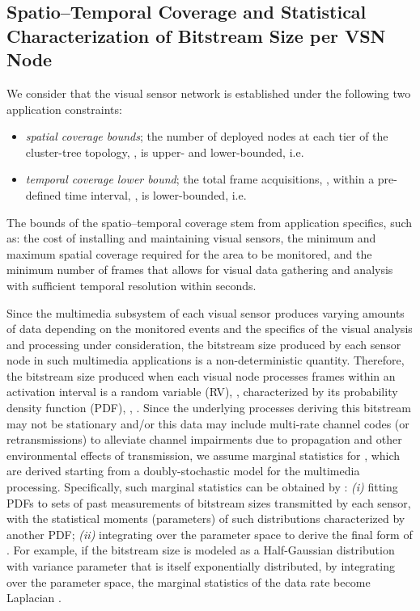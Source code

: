 \documentclass[twocolumn,english]{IEEEtran}
\theoremstyle{plain}
\theoremstyle{definition}
\begin{document}
\subsection{Spatio--Temporal Coverage and Statistical Characterization of Bitstream
Size per VSN Node}

We consider that the visual sensor network is established under the
following two application constraints:

\begin{itemize}[leftmargin=*] 
\item

\emph{spatial coverage bounds}; the number of deployed nodes at each
tier of the cluster-tree topology, , is upper- and lower-bounded,
i.e. 

\item

\emph{temporal coverage lower bound}; the total frame acquisitions,
, within a pre-defined time interval, , is lower-bounded,
i.e. 

\end{itemize}

The bounds of the spatio--temporal coverage stem from application
specifics, such as: the cost of installing and maintaining visual
sensors, the minimum and maximum spatial coverage required for the
area to be monitored, and the minimum number of frames that allows
for visual data gathering and analysis with sufficient temporal resolution
within  seconds.

Since the multimedia subsystem of each visual sensor produces varying
amounts of data depending on the monitored events and the specifics
of the visual analysis and processing under consideration, the bitstream
size produced by each sensor node in such multimedia applications
is a non-deterministic quantity. Therefore, the bitstream size produced
when each visual node processes  frames within an activation interval
is a random variable (RV), , characterized by its
probability density function (PDF), , .
Since the underlying processes deriving this bitstream may not be
stationary and/or this data may include multi-rate channel codes (or
retransmissions) to alleviate channel impairments due to propagation
and other environmental effects of transmission, we assume marginal
statistics for , which are derived starting
from a doubly-stochastic model for the multimedia processing. Specifically,
such marginal statistics can be obtained by \cite{LamGoodmanDCT,foo2008analytical}:
\emph{(i)} fitting PDFs to sets of past measurements of bitstream
sizes transmitted by each sensor, with the statistical moments (parameters)
of such distributions characterized by another PDF; \emph{(ii)} integrating
over the parameter space to derive the final form of .
For example, if the bitstream size is modeled as a Half-Gaussian distribution
with variance parameter that is itself exponentially distributed,
by integrating over the parameter space, the marginal statistics of
the data rate become Laplacian \cite{LamGoodmanDCT,foo2008analytical}.
\end{document}
